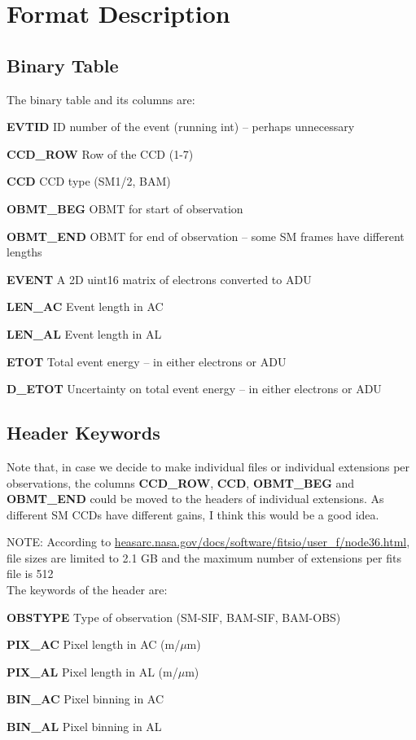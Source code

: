 \documentclass[12pt]{article}
\begin{document}
\section{Format Description}

\subsection{Binary Table}
The binary table and its columns are:

\textbf{EVTID} ID number of the event (running int) -- perhaps unnecessary

\textbf{CCD\_ROW} Row of the CCD (1-7)

\textbf{CCD} CCD type (SM1/2, BAM)

\textbf{OBMT\_BEG} OBMT for start of observation

\textbf{OBMT\_END} OBMT for end of observation -- some SM frames have different lengths

\textbf{EVENT} A 2D uint16 matrix of electrons converted to ADU

\textbf{LEN\_AC} Event length in AC

\textbf{LEN\_AL} Event length in AL

\textbf{ETOT} Total event energy -- in either electrons or ADU

\textbf{D\_ETOT} Uncertainty on total event energy -- in either electrons or ADU

\subsection{Header Keywords}
Note that, in case we decide to make individual files or individual extensions per observations, the columns \textbf{CCD\_ROW}, \textbf{CCD}, \textbf{OBMT\_BEG} and \textbf{OBMT\_END} could be moved to the headers of individual extensions. As different SM CCDs have different gains, I think this would be a good idea.

NOTE: According to \url{heasarc.nasa.gov/docs/software/fitsio/user_f/node36.html}, file sizes are limited to 2.1 GB and the maximum number of extensions per fits file is 512
\\

\noindent The keywords of the header are:

\textbf{OBSTYPE} Type of observation (SM-SIF, BAM-SIF, BAM-OBS)

\textbf{PIX\_AC} Pixel length in AC (m/$\mu$m)

\textbf{PIX\_AL} Pixel length in AL (m/$\mu$m)

\textbf{BIN\_AC} Pixel binning in AC

\textbf{BIN\_AL} Pixel binning in AL
\end{document}
